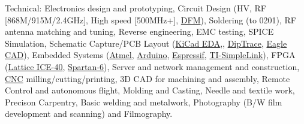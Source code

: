 \inlineheadsection  %
  {Technical:}
  {Electronics design and prototyping,
   Circuit Design (HV, RF [868M/915M/2.4GHz], High speed [500MHz+], \href{https://en.wikipedia.org/wiki/Design_for_manufacturability}{DFM}),
   Soldering (to 0201),
   RF antenna matching and tuning,
   Reverse engineering,
   EMC testing,
   SPICE Simulation,
   Schematic Capture/PCB Layout
   (\href{http://kicad-pcb.org/}{KiCad EDA},,
   \href{http://diptrace.com/}{DipTrace},
   \href{http://www.cadsoftusa.com/}{Eagle CAD}),
   Embedded Systems
    (\href{http://www.atmel.com/}{Atmel},
    \href{http://www.arduino.cc/}{Arduino},
    \href{https://espressif.com/}{Espressif},
    \href{http://www.ti.com/wireless-connectivity/simplelink-solutions/overview/overview.html}{TI-SimpleLink}),
   FPGA
    (\href{http://www.latticesemi.com/iCE40}{Lattice ICE-40},
    \href{http://www.xilinx.com/products/silicon-devices/fpga/spartan-6.html}{Spartan-6}),
   Server and network management and construction,
   \href{http://en.wikipedia.org/wiki/Numerical_control}{CNC} milling/cutting/printing,
   3D CAD for machining and assembly,
   Remote Control and autonomous flight,
   Molding and Casting,
   Needle and textile work, 
   Precison Carpentry, 
   Basic welding and metalwork,
   Photography (B/W film development and scanning) and Filmography.
  }
  \vspace{0.3em}